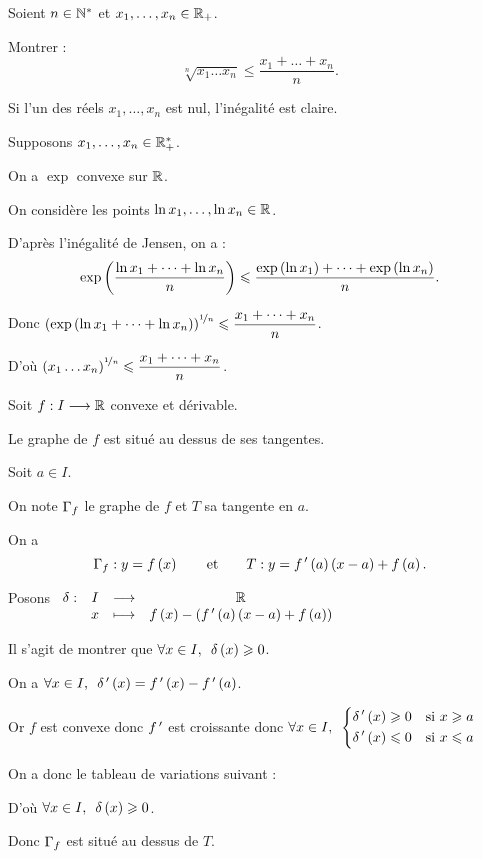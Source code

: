 \begin{exo}
Soient \(n\in\mathbb{N}^*\) et \(x_1,\dots,x_n\in\mathbb{R}_+\).

Montrer : \[\sqrt[n]{x_1\dots x_n}\leq\dfrac{x_1+\dots+x_n}{n}.\]
\end{exo}

\begin{corr}
Si l'un des réels \(x_1,\dots,x_n\) est nul, l'inégalité est claire.

Supposons \(x_1,\dots,x_n\in\mathbb{R}_+^*\).

On a \(\exp\) convexe sur \(\mathbb{R}\).

On considère les points \(\ln x_1,\dots,\ln x_n\in\mathbb{R}\).

D'après l'inégalité de Jensen, on a : \[\exp\left(\dfrac{\ln x_1+\dots+\ln x_n}{n}\right)\leqslant\dfrac{\exp\left(\ln x_1\right)+\dots+\exp\left(\ln x_n\right)}{n}.\]

Donc \(\left(\exp\left(\ln x_1+\dots+\ln x_n\right)\right)^{\nicefrac{1}{n}}\leqslant\dfrac{x_1+\dots+x_n}{n}\).

D'où \(\left(x_1\dots x_n\right)^{\nicefrac{1}{n}}\leqslant\dfrac{x_1+\dots+x_n}{n}\).
\end{corr}

\begin{prop}
Soit \(f:I\longrightarrow\mathbb{R}\) convexe et dérivable.

Le graphe de \(f\) est situé au dessus de ses tangentes.
\end{prop}

\begin{dem}
Soit \(a\in I\).

On note \(\Gamma_{f}\) le graphe de \(f\) et \(T\) sa tangente en \(a\).

On a \[\Gamma_{f}:y=f\left(x\right)\qquad\text{et}\qquad T:y=f^{\,\prime}\left(a\right)\left(x-a\right)+f\left(a\right).\]

Posons \(\begin{array}[t]{cccc}\delta : & I & \longrightarrow & \mathbb{R} \\ & x & \longmapsto & f\left(x\right)-\left(f^{\,\prime}\left(a\right)\left(x-a\right)+f\left(a\right)\right)\end{array}\)

Il s'agit de montrer que \(\quantifs{\forall x\in I}\delta\paren{x}\geq0\).

On a \(\quantifs{\forall x\in I}\delta\prim\paren{x}=f\prim\paren{x}-f\prim\paren{a}\).

Or \(f\) est convexe donc \(f^{\,\prime}\) est croissante donc \(\quantifs{\forall x\in I}\begin{dcases}\delta\prim\paren{x}\geq0 &\text{si }x\geq a \\ \delta\prim\paren{x}\leq0 &\text{si }x\leq a\end{dcases}\)

On a donc le tableau de variations suivant :

\begin{center}
\begin{tkz}
\end{tkz}
\end{center}

D'où \(\quantifs{\forall x\in I}\delta\paren{x}\geq0\).

Donc \(\Gamma_{f}\) est situé au dessus de \(T\).
\end{dem}

